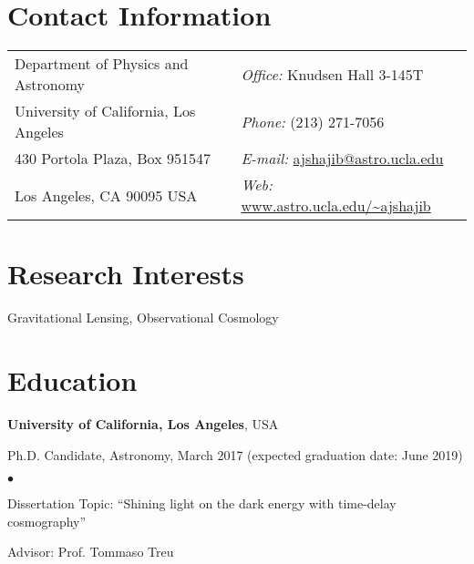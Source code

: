 \documentclass[margin,line]{res}
\newenvironment{list1}{
  \begin{list}{\ding{113}}{%
      \setlength{\itemsep}{0in}
      \setlength{\parsep}{0in} \setlength{\parskip}{0in}
      \setlength{\topsep}{0in} \setlength{\partopsep}{0in} 
      \setlength{\leftmargin}{0.17in}}}{\end{list}}
\newenvironment{list2}{
  \begin{list}{$\bullet$}{%
      \setlength{\itemsep}{0in}
      \setlength{\parsep}{0in} \setlength{\parskip}{0in}
      \setlength{\topsep}{0in} \setlength{\partopsep}{0in} 
      \setlength{\leftmargin}{0.2in}}}{\end{list}}
\begin{document}

\begin{resume}
\section{\sc Contact Information}
\vspace{.05in}
\begin{tabular}{@{}p{3in}p{3in}}                  
Department of Physics and Astronomy    & {\it Office:} Knudsen Hall 3-145T   \\     
University of California, Los Angeles  & {\it Phone:}  (213) 271-7056 \\     
430 Portola Plaza, Box 951547 				         & {\it E-mail:}  \href{mailto:ajshajib@astro.ucla.edu}{ajshajib@astro.ucla.edu} \\
Los Angeles, CA 90095 USA  & {\it Web:} \url{www.astro.ucla.edu/~ajshajib} \\   
\end{tabular}


\section{\sc Research Interests}
Gravitational Lensing, Observational Cosmology

\section{\sc Education}
{\bf University of California, Los Angeles}, USA\\
\vspace*{-.1in}
\begin{list1}
\item[] Ph.D. Candidate, Astronomy, March 2017 (expected
  graduation date: June 2019)
\begin{list2}
\vspace*{.05in}
\item Dissertation Topic:  ``Shining light on the dark energy with time-delay cosmography'' 
\item Advisor:  Prof. Tommaso Treu
\end{list2}
\end{list1}
\vspace*{.05in}


\end{resume}
\end{document}
